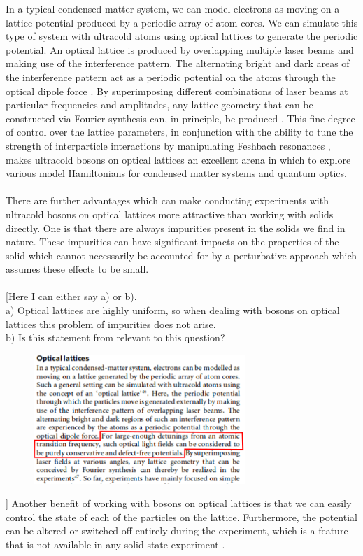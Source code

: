 \documentclass[a4paper,10pt]{article}
\begin{document}
In a typical condensed matter system, we can model electrons as moving on a lattice potential produced by a periodic array of atom cores. 
We can simulate this type of system with ultracold atoms using optical lattices to generate the periodic potential. An optical lattice is 
produced by overlapping multiple laser beams and making use of the interference pattern. The alternating bright and dark areas of the interference
pattern act as a periodic potential on the atoms through the optical dipole force \cite{Bloch2012}. By superimposing different combinations of laser
beams at particular frequencies and amplitudes, any lattice geometry that can be constructed via Fourier synthesis can, in principle, be produced \cite{Bloch2012}.
This fine degree of control over the lattice parameters, in conjunction with the ability to tune the strength of interparticle interactions by 
manipulating Feshbach resonances \cite{Chin2010}, makes ultracold bosons on optical lattices an excellent arena in which to explore various model 
Hamiltonians for condensed matter systems and quantum optics. \\\\

There are further advantages which can make conducting experiments with ultracold bosons on optical lattices more attractive than working with 
solids directly. One is that there are always impurities present in the solids we find in nature. These impurities can have significant impacts
on the properties of the solid which cannot necessarily be accounted for by a perturbative approach which assumes these effects 
to be small. \\\\

 [Here I can either say a) or b).\\ a) Optical lattices are highly uniform, so when dealing with bosons on optical lattices this problem of impurities does not arise.\\
b) Is this statement from \cite{Bloch2012} relevant to this question?
\begin{figure}[H]
 \begin{center}
   \includegraphics[width=8cm]{optical_lattices_Bloch}
 \end{center}
 \end{figure}
]
Another benefit of working with bosons on optical lattices is that we can easily control the state of each of the particles on the lattice. Furthermore, 
the potential can be altered or switched off entirely during the experiment, which is a feature that is not available in any solid state experiment \cite{Morsch2006}.
\end{document}
